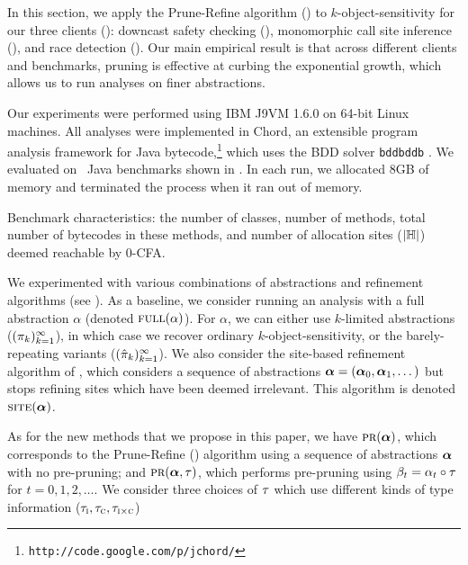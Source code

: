 
In this section, we apply the Prune-Refine algorithm () to
$k$-object-sensitivity for our three clients ():
downcast safety checking (\downcast),
monomorphic call site inference (\monosite),
and race detection (\race).
Our main empirical result is that across different clients and benchmarks,
pruning is effective at curbing the exponential growth,
which allows us to run analyses on finer abstractions.


Our experiments were performed using IBM J9VM 1.6.0 on 64-bit Linux machines.
All analyses were implemented in Chord,
an extensible program analysis framework for Java bytecode,\footnote{{\tt{http://code.google.com/p/jchord/}}}
which uses the BDD solver {\tt bddbddb} \cite{Whaley2007}.
We evaluated on \numBenchmarks\ Java benchmarks shown in .
In each run, we allocated 8GB of memory and terminated the process when it ran out of memory.

\begin{table*}
\centering

\caption{Benchmark characteristics:
the number of classes,
number of methods,
total number of bytecodes in these methods,
and number of allocation sites ($|{\mathbb H}|$)
deemed reachable by 0-CFA.
\label{tab:benchmarks}}
\end{table*}

We experimented with various combinations of abstractions and refinement
algorithms (see ).  As a baseline, we consider running an analysis
with a full abstraction $\alpha$ (denoted $\text{\sc full}(\alpha)$).
For $\alpha$, we can either use $k$-limited abstractions
($(\pi_k)_{k=1}^\infty$), in which case we recover ordinary $k$-object-sensitivity,
or the barely-repeating variants ($(\hat{\pi}_k)_{k=1}^\infty$).
We also consider the site-based refinement algorithm of \cite{liang11minimal},
which considers a sequence of abstractions $\mbox{\boldmath$\alpha$} = (\mbox{\boldmath$\alpha$}_0, \mbox{\boldmath$\alpha$}_1, \dots)$
but stops refining sites which have been deemed irrelevant.  This algorithm is denoted $\text{\sc site}(\mbox{\boldmath$\alpha$})$.

As for the new methods that we propose in this paper,
we have $\text{\sc pr}(\mbox{\boldmath$\alpha$})$, which corresponds to the Prune-Refine (\PR) algorithm using a sequence of abstractions $\mbox{\boldmath$\alpha$}$ with no pre-pruning;
and $\text{\sc pr}(\mbox{\boldmath$\alpha$},\tau)$, which performs pre-pruning using $\beta_t = \alpha_t
\circ \tau$ for $t = 0, 1, 2, \dots$.  We consider three choices of $\tau$
which use different kinds of type information ($\tau_{\text{\sc i}},\tau_{\text{\sc c}},\tau_{\text{\sc i} \times \text{\sc c}}$)

